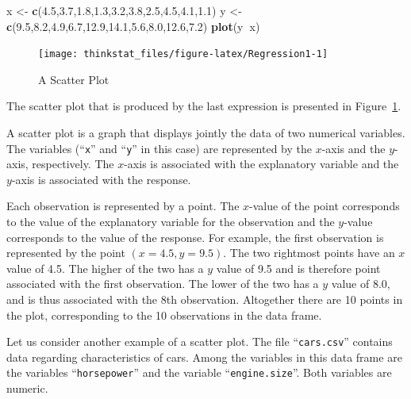 \documentclass[]{krantz}
\makeatletter
\newenvironment{Shaded}{\begin{snugshade}}{\end{snugshade}}
\newcommand{\KeywordTok}[1]{\textcolor[rgb]{0.13,0.29,0.53}{\textbf{#1}}}
\newcommand{\FloatTok}[1]{\textcolor[rgb]{0.00,0.00,0.81}{#1}}
\newcommand{\StringTok}[1]{\textcolor[rgb]{0.31,0.60,0.02}{#1}}
\newcommand{\OperatorTok}[1]{\textcolor[rgb]{0.81,0.36,0.00}{\textbf{#1}}}
\newcommand{\NormalTok}[1]{#1}
\newenvironment{kframe}{%
\medskip{}
\setlength{\fboxsep}{.8em}
 \def\at@end@of@kframe{}%
 \ifinner\ifhmode%
  \def\at@end@of@kframe{\end{minipage}}%
  \begin{minipage}{\columnwidth}%
 \fi\fi%
 \def\FrameCommand##1{\hskip\@totalleftmargin \hskip-\fboxsep
 \colorbox{shadecolor}{##1}\hskip-\fboxsep
     \hskip-\linewidth \hskip-\@totalleftmargin \hskip\columnwidth}%
 \MakeFramed {\advance\hsize-\width
   \@totalleftmargin\z@ \linewidth\hsize
   \@setminipage}}%
 {\par\unskip\endMakeFramed%
 \at@end@of@kframe}
\renewenvironment{Shaded}{\begin{kframe}}{\end{kframe}}
\theoremstyle{definition}
\theoremstyle{definition}
\theoremstyle{definition}
\theoremstyle{remark}
\makeatother
\begin{document}
\begin{Shaded}
\begin{Highlighting}[]
\NormalTok{x <-}\StringTok{ }\KeywordTok{c}\NormalTok{(}\FloatTok{4.5}\NormalTok{,}\FloatTok{3.7}\NormalTok{,}\FloatTok{1.8}\NormalTok{,}\FloatTok{1.3}\NormalTok{,}\FloatTok{3.2}\NormalTok{,}\FloatTok{3.8}\NormalTok{,}\FloatTok{2.5}\NormalTok{,}\FloatTok{4.5}\NormalTok{,}\FloatTok{4.1}\NormalTok{,}\FloatTok{1.1}\NormalTok{)}
\NormalTok{y <-}\StringTok{ }\KeywordTok{c}\NormalTok{(}\FloatTok{9.5}\NormalTok{,}\FloatTok{8.2}\NormalTok{,}\FloatTok{4.9}\NormalTok{,}\FloatTok{6.7}\NormalTok{,}\FloatTok{12.9}\NormalTok{,}\FloatTok{14.1}\NormalTok{,}\FloatTok{5.6}\NormalTok{,}\FloatTok{8.0}\NormalTok{,}\FloatTok{12.6}\NormalTok{,}\FloatTok{7.2}\NormalTok{)}
\KeywordTok{plot}\NormalTok{(y}\OperatorTok{~}\NormalTok{x)}
\end{Highlighting}
\end{Shaded}

\begin{figure}

{\centering \texttt{[image: thinkstat\_files/figure-latex/Regression1-1]} 

}

\caption{A Scatter Plot}\label{fig:Regression1}
\end{figure}

The scatter plot that is produced by the last expression is presented in
Figure~\ref{fig:Regression1}.

A scatter plot is a graph that displays jointly the data of two
numerical variables. The variables (``\texttt{x}'' and ``\texttt{y}'' in
this case) are represented by the \(x\)-axis and the \(y\)-axis,
respectively. The \(x\)-axis is associated with the explanatory variable
and the \(y\)-axis is associated with the response.

Each observation is represented by a point. The \(x\)-value of the point
corresponds to the value of the explanatory variable for the observation
and the \(y\)-value corresponds to the value of the response. For
example, the first observation is represented by the point
\((x=4.5,y=9.5)\). The two rightmost points have an \(x\) value of 4.5.
The higher of the two has a \(y\) value of 9.5 and is therefore point
associated with the first observation. The lower of the two has a \(y\)
value of 8.0, and is thus associated with the 8th observation.
Altogether there are 10 points in the plot, corresponding to the 10
observations in the data frame.

Let us consider another example of a scatter plot. The file
``\texttt{cars.csv}'' contains data regarding characteristics of cars.
Among the variables in this data frame are the variables
``\texttt{horsepower}'' and the variable ``\texttt{engine.size}''. Both
variables are numeric.
\end{document}
